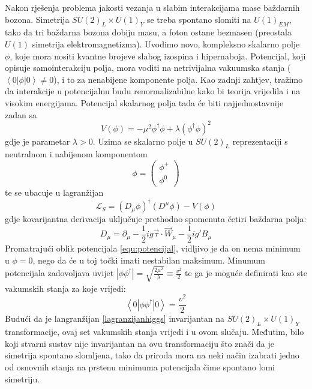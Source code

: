 \documentclass[a4paper,12pt]{report}
\newcommand{\bopk}[3]{\left<#1\left|#2\right|#3\right>}
\begin{document}
Nakon rješenja problema jakosti vezanja u slabim interakcijama mase baždarnih bozona. Simetrija $SU(2)_{L}\times U(1)_{Y}$ se treba spontano slomiti na $U(1)_{EM}$, tako da tri baždarna bozona dobiju masu, a foton ostane bezmasen (preostala $U(1)$ simetrija elektromagnetizma). Uvodimo novo, kompleksno skalarno polje $\phi$, koje mora nositi kvantne brojeve slabog izospina i hipernaboja. Potencijal, koji opisuje samointerakciju polja, mora voditi na netrivijalna vakuumska stanja ($\bopk{0}{\phi}{0}\neq0$), i to za nenabijene komponente polja. Kao zadnji zahtjev, tražimo da interakcije u potencijalnu budu renormalizabilne kako bi teorija vrijedila i na visokim energijama. Potencijal skalarnog polja tada će biti najjednostavnije zadan sa 
\begin{equation}
 V(\phi)=-\mu^{2}\phi^{\dagger}\phi+\lambda(\phi^{\dagger}\phi)^{2}
\label{equ:potencijal}
\end{equation}
gdje je parametar $\lambda>0$. 
Uzima se skalarno polje u $SU(2)_{L}$ reprezentaciji s neutralnom i nabijenom komponentom
\begin{equation}
 \phi=\left(\begin{array}{c}\phi^{+}\\ \phi^{0}\end{array}\right)
  \label{equ:higgspolje}
\end{equation}
te se ubacuje u lagranžijan  
\begin{equation}
 \mathcal{L}_{S}=(D_{\mu}\phi)^{\dagger}(D^{\mu}\phi)-V(\phi)
\label{equ:lagranzijanhiggs}
\end{equation}
gdje kovarijantna derivacija uključuje prethodno spomenuta četiri baždarna polja:
\begin{equation}
 D_{\mu}=\partial_{\mu}-\frac{1}{2}ig\vec{\tau}\cdot\vec{W}_{\mu}-\frac{1}{2}ig'B_{\mu}
\end{equation}
Promatrajući oblik potencijala \ref{equ:potencijal}, vidljivo je da on nema minimum u $\phi=0$, nego da će u toj točki imati nestabilan maksimum. Minumum potencijala zadovoljava uvijet $|\phi \phi^{\dagger}|=\sqrt{\frac{2 \mu^2}{\lambda}} \equiv \frac{v^2}{2}$ te ga je moguće definirati kao ste vakumskih stanja za koje vrijedi:
\begin{equation}
 \bopk{0}{\phi\phi^{\dagger}}{0} = \frac{v^2}{2}
\label{equ:ocekivanavrijednost}
\end{equation}
Budući da je langranžijan \ref{lagranzijanhiggs} invarijantan na $SU(2)_L\times U(1)_Y$ transformacije, ovaj set vakumskih stanja vrijedi i u ovom slučaju. Međutim, bilo koji stvarni sustav nije invarijantan na ovu transformaciju što znači da je simetrija spontano slomljena, tako da priroda mora na neki način izabrati jedno od osnovnih stanja na prstenu minimuma potencijala čime spontano lomi simetriju. \\ 
\end{document}

